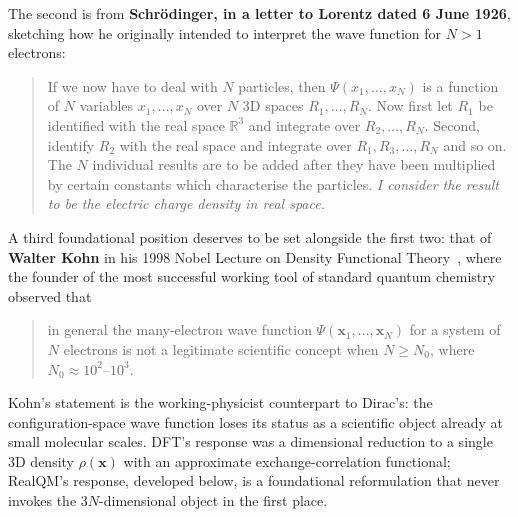 \documentclass[11pt]{article}
\begin{document}
The second is from \textbf{Schr\"odinger, in a letter to Lorentz dated 6 June 1926}, sketching how he originally intended to interpret the wave function for $N>1$ electrons:

\begin{quote}
If we now have to deal with $N$ particles, then $\Psi(x_1, \ldots, x_N)$ is a function of $N$ variables $x_1, \ldots, x_N$ over $N$ 3D spaces $R_1, \ldots, R_N$. Now first let $R_1$ be identified with the real space $\mathbb{R}^3$ and integrate over $R_2, \ldots, R_N$. Second, identify $R_2$ with the real space and integrate over $R_1, R_3, \ldots, R_N$ and so on. The $N$ individual results are to be added after they have been multiplied by certain constants which characterise the particles. \emph{I consider the result to be the electric charge density in real space.}
\end{quote}

A third foundational position deserves to be set alongside the first two: that of \textbf{Walter Kohn} in his 1998 Nobel Lecture on Density Functional Theory~\cite{Kohn1998Nobel}, where the founder of the most successful working tool of standard quantum chemistry observed that
\begin{quote}
in general the many-electron wave function $\Psi(\mathbf{x}_1, \ldots, \mathbf{x}_N)$ for a system of $N$ electrons is not a legitimate scientific concept when $N \geq N_0$, where $N_0 \approx 10^2$--$10^3$.
\end{quote}
Kohn's statement is the working-physicist counterpart to Dirac's: the configuration-space wave function loses its status as a scientific object already at small molecular scales. DFT's response was a dimensional reduction to a single 3D density $\rho(\mathbf{x})$ with an approximate exchange-correlation functional; RealQM's response, developed below, is a foundational reformulation that never invokes the $3N$-dimensional object in the first place.
\end{document}
